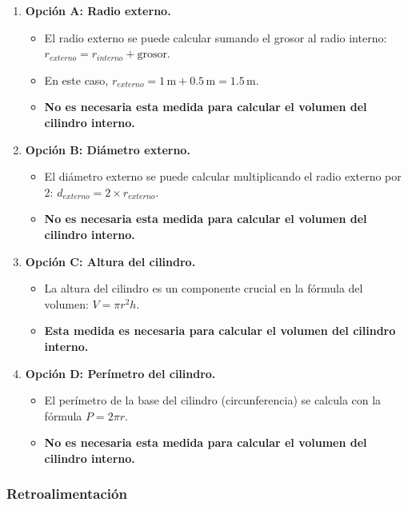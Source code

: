 \documentclass[
]{article}
\providecommand{\tightlist}{%
  \setlength{\itemsep}{0pt}\setlength{\parskip}{0pt}}
\begin{document}
\begin{enumerate}
\def\labelenumi{\arabic{enumi}.}
\tightlist
\item
  \textbf{Opción A: Radio externo.}

  \begin{itemize}
  \tightlist
  \item
    El radio externo se puede calcular sumando el grosor al radio
    interno: \(r_{externo} = r_{interno} +  \text{grosor}\).
  \item
    En este caso,
    \(r_{externo} = 1 \,    \text{m} + 0.5 \,   \text{m} = 1.5 \,   \text{m}\).
  \item
    \textbf{No es necesaria esta medida para calcular el volumen del
    cilindro interno.}
  \end{itemize}
\item
  \textbf{Opción B: Diámetro externo.}

  \begin{itemize}
  \tightlist
  \item
    El diámetro externo se puede calcular multiplicando el radio externo
    por 2: \(d_{externo} = 2     \times r_{externo}\).
  \item
    \textbf{No es necesaria esta medida para calcular el volumen del
    cilindro interno.}
  \end{itemize}
\item
  \textbf{Opción C: Altura del cilindro.}

  \begin{itemize}
  \tightlist
  \item
    La altura del cilindro es un componente crucial en la fórmula del
    volumen: \(V = \pi r^2 h\).
  \item
    \textbf{Esta medida es necesaria para calcular el volumen del
    cilindro interno.}
  \end{itemize}
\item
  \textbf{Opción D: Perímetro del cilindro.}

  \begin{itemize}
  \tightlist
  \item
    El perímetro de la base del cilindro (circunferencia) se calcula con
    la fórmula \(P = 2 \pi r\).
  \item
    \textbf{No es necesaria esta medida para calcular el volumen del
    cilindro interno.}
  \end{itemize}
\end{enumerate}

\subsubsection{Retroalimentación}\label{retroalimentaciuxf3n}
\end{document}
